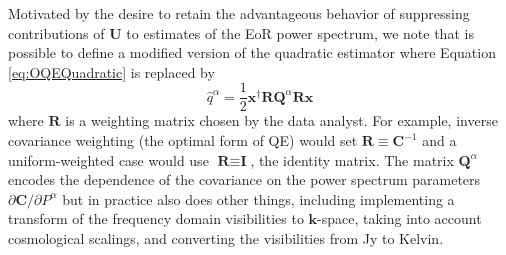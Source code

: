 \documentclass[preprint2,numberedappendix,tighten]{aastex6}  %
\newcommand{\C}{\mathbf{C}}
\begin{document}
Motivated by the desire to retain the advantageous behavior of suppressing contributions of $\mathbf{U}$ to estimates of the EoR power spectrum, we note that is possible to define a modified version of the quadratic estimator 
where Equation \eqref{eq:OQEQuadratic} is replaced by
\begin{equation}
\label{eq:qhat}
\widehat{q}^{\alpha} = \frac{1}{2}\textbf{x}^{\dagger}\textbf{R}\textbf{Q}^{\alpha}\textbf{R}\textbf{x}
\end{equation}
where $\textbf{R}$ is a weighting matrix chosen by the data analyst.  For example, inverse covariance weighting (the optimal form of QE) would set $\textbf{R} \equiv \textbf{C}^{-1}$ and a uniform-weighted case would use $\textbf{R} \equiv \textbf{I}$, the identity matrix.
The matrix $\textbf{Q}^{\alpha}$ encodes the dependence of the covariance on the power spectrum parameters $\partial \C/\partial P^\alpha$ but in practice also does other things, including implementing a transform of the frequency domain visibilities to $\mathbf{k}$-space, taking into account cosmological scalings, and converting the visibilities from Jy to Kelvin.
\end{document}
